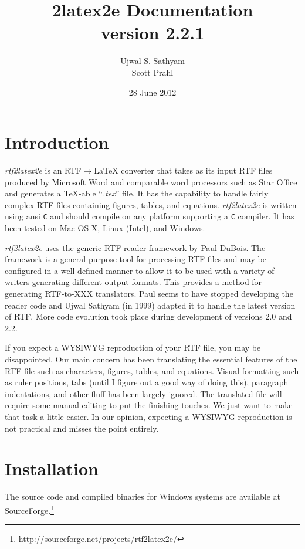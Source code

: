 \documentclass{article}
\title{\rtf2latex2e Documentation\\
version 2.2.1}
\author{Ujwal S. Sathyam\\ Scott Prahl}
\date{28 June 2012}
\def\rtf2latex2e{{\it rtf2latex2e}}
\begin{document}
 
\maketitle

\section{Introduction 
\label{intro}} \rtf2latex2e is an RTF$\rightarrow${\LaTeX}
converter that takes as its input RTF files produced by Microsoft Word
and comparable word processors such as Star Office and generates a
\TeX-able ``{\it .tex}'' file.  It has the capability to handle fairly
complex RTF files containing figures, tables, and equations.  
\rtf2latex2e is written using ansi \texttt{C} and
should compile on any platform supporting a \texttt{C} compiler.  It has
been tested on Mac OS X, Linux (Intel), and Windows.

\rtf2latex2e uses the generic
\href{http://www.snake.net/software/RTF/}{RTF reader}
framework by Paul DuBois.  The framework is a general purpose tool for
processing RTF files and may be configured in a well-defined manner to
allow it to be used with a variety of writers generating different
output formats.  This provides a method for generating RTF-to-XXX
translators.  Paul seems to have stopped developing the
reader code and Ujwal Sathyam (in 1999) adapted it to handle the
latest version of RTF.  More code evolution took place during
development of versions 2.0 and 2.2.

If you expect a WYSIWYG reproduction of your RTF file, you may be
disappointed.  Our main concern has been translating the essential
features of the RTF file such as characters, figures, tables, and
equations.  Visual formatting
such as ruler positions, tabs (until I figure out a good way of doing
this), paragraph indentations, and other fluff has been largely ignored.  
The translated {\LaTeXe} file will require some manual editing to put the
finishing touches.  We just want to make that task a little easier.  In
our opinion, expecting a WYSIWYG reproduction is not practical and
misses the point entirely.

\section{Installation}
The source code and compiled binaries for Windows systems are available at
SourceForge.\footnote{\url{http://sourceforge.net/projects/rtf2latex2e/}}
\end{document}
